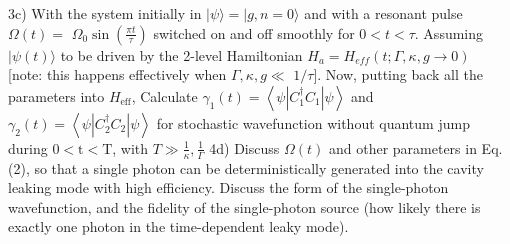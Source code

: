 \documentclass[hyperref, a4paper]{article}
\begin{document}
3c) With the system initially in $|\psi\rangle=|g, n=0\rangle$ and with a resonant pulse $\Omega(t)=$ $\Omega_{0} \sin \left(\frac{\pi t}{\tau}\right)$ switched on and off smoothly for $0<t<\tau$. Assuming $|\psi(t)\rangle$ to be driven by the 2-level Hamiltonian $H_{a}=H_{e f f}(t ; \Gamma, \kappa, g \rightarrow 0) \quad$ [note: this happens effectively when $\Gamma, \kappa, g \ll$ $1 / \tau]$. Now, putting back all the parameters into $H_\text{eff}$, Calculate $\gamma_{1}(t)=\left\langle\psi\left|C_{1}^{\dagger} C_{1}\right| \psi\right\rangle$ and $\gamma_{2}(t)=\left\langle\psi\left|C_{2}^{\dagger} C_{2}\right| \psi\right\rangle$ for stochastic wavefunction without quantum jump during $0<\mathrm{t}<\mathrm{T}$, with $T \gg \frac{1}{\kappa}, \frac{1}{\Gamma}$
4d) Discuss $\Omega(t)$ and other parameters in Eq. (2), so that a single photon can be deterministically generated into the cavity leaking mode with high efficiency. Discuss the form of the single-photon wavefunction, and the fidelity of the single-photon source (how likely there is exactly one photon in the time-dependent leaky mode).
\end{document}
